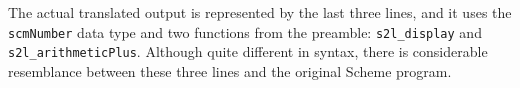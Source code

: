 The actual translated output is represented by the last three lines, and it uses
the \texttt{scmNumber} data type and two functions from the preamble:
\texttt{s2l\_display} and \texttt{s2l\_arithmeticPlus}. Although quite different
in syntax, there is considerable resemblance between these three lines and the
original Scheme program.
